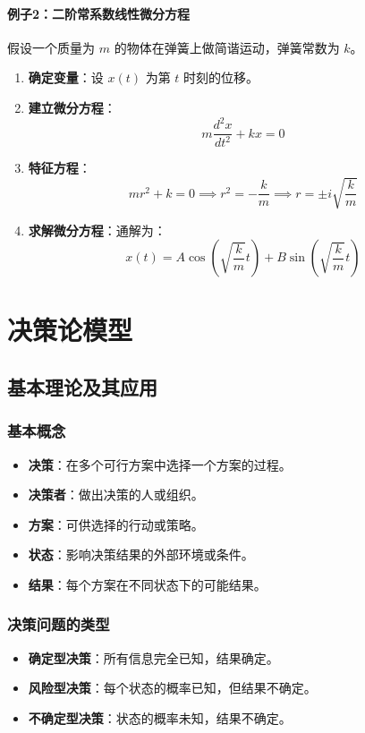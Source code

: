 \documentclass[UTF8]{ctexart}
\begin{document}
\paragraph{例子2：二阶常系数线性微分方程}
假设一个质量为 \( m \) 的物体在弹簧上做简谐运动，弹簧常数为 \( k \)。
\begin{enumerate}
    \item \textbf{确定变量}：设 \( x(t) \) 为第 \( t \) 时刻的位移。
    \item \textbf{建立微分方程}：
    \[
    m \frac{d^2 x}{dt^2} + kx = 0
    \]
    \item \textbf{特征方程}：
    \[
    mr^2 + k = 0 \implies r^2 = -\frac{k}{m} \implies r = \pm i\sqrt{\frac{k}{m}}
    \]
    \item \textbf{求解微分方程}：通解为：
    \[
    x(t) = A \cos \left(\sqrt{\frac{k}{m}} t \right) + B \sin \left(\sqrt{\frac{k}{m}} t \right)
    \]
\end{enumerate}

\newpage

\section {决策论模型}
\subsection {基本理论及其应用}
\subsubsection {基本概念}
\begin{itemize}
    \item \textbf{决策}：在多个可行方案中选择一个方案的过程。
    \item \textbf{决策者}：做出决策的人或组织。
    \item \textbf{方案}：可供选择的行动或策略。
    \item \textbf{状态}：影响决策结果的外部环境或条件。
    \item \textbf{结果}：每个方案在不同状态下的可能结果。
\end{itemize}

\subsubsection {决策问题的类型}
\begin{itemize}
    \item \textbf{确定型决策}：所有信息完全已知，结果确定。
    \item \textbf{风险型决策}：每个状态的概率已知，但结果不确定。
    \item \textbf{不确定型决策}：状态的概率未知，结果不确定。
\end{itemize}
\end{document}
